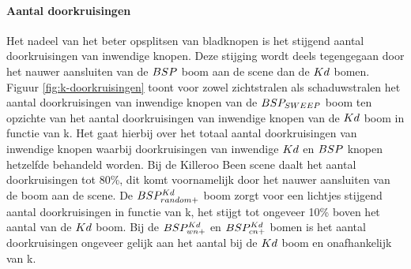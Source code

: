 \begin{figure}
  \centering
  
\end{figure}

\paragraph{Aantal doorkruisingen}
Het nadeel van het beter opsplitsen van bladknopen is het stijgend aantal doorkruisingen van inwendige knopen.
Deze stijging wordt deels tegengegaan door het nauwer aansluiten van de $BSP$ boom aan de scene dan de $Kd$ bomen.
Figuur \ref{fig:k-doorkruisingen} toont voor zowel zichtstralen als schaduwstralen het aantal doorkruisingen van inwendige knopen van de $BSP_{SWEEP}$ boom ten opzichte van het aantal doorkruisingen van inwendige knopen van de $Kd$ boom in functie van k.
Het gaat hierbij over het totaal aantal doorkruisingen van inwendige knopen waarbij doorkruisingen van inwendige $Kd$ en $BSP$ knopen hetzelfde behandeld worden. 
Bij de Killeroo Been scene daalt het aantal doorkruisingen tot 80\%, dit komt voornamelijk door het nauwer aansluiten van de boom aan de scene.
De $BSP^{Kd}_{random+}$ boom zorgt voor een lichtjes stijgend aantal doorkruisingen in functie van k, het stijgt tot ongeveer 10\% boven het aantal van de $Kd$ boom.
Bij de $BSP^{Kd}_{wn+}$ en $BSP^{Kd}_{cn+}$ bomen is het aantal doorkruisingen ongeveer gelijk aan het aantal bij de $Kd$ boom en onafhankelijk van k.

